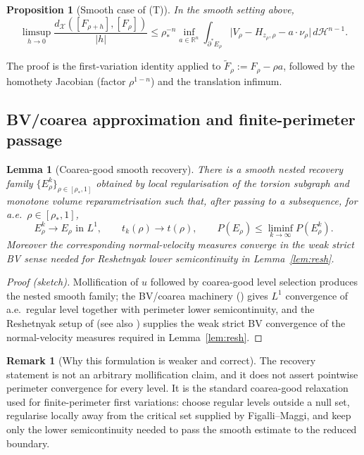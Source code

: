 \documentclass[11pt]{article}
\newtheorem{proposition}[theorem]{Proposition}
\newtheorem{lemma}[theorem]{Lemma}
\theoremstyle{definition}
\newtheorem{remark}[theorem]{Remark}
\newcommand{\R}{\mathbb{R}}
\newcommand{\rstar}{\rho_{*}}
\newcommand{\X}{\mathcal X}
\begin{document}
\begin{proposition}[Smooth case of (T)]\label{prop:T-smooth}
In the smooth setting above,
\begin{equation}\label{eq:T-smooth-X}
   \limsup_{h\to 0}\frac{d_\X([F_{\rho+h}],[F_\rho])}{|h|}
   \le \rstar^{-n}\inf_{a\in\R^n}\int_{\partial^*E_\rho}
       \bigl|V_\rho-H_{z_\rho,\rho}-a\cdot\nu_\rho\bigr|\,d\mathcal H^{n-1}.
\end{equation}
\end{proposition}

The proof is the first-variation identity \cite[\S17.3]{Maggi2012}
applied to $\widetilde F_\rho:=F_\rho-\rho a$, followed by the homothety
Jacobian (factor $\rho^{1-n}$) and the translation infimum.

\subsection{BV/coarea approximation and finite-perimeter passage}\label{ss:T-bv}

\begin{lemma}[Coarea-good smooth recovery]\label{lem:approx}
There is a smooth nested recovery family $\{E_\rho^k\}_{\rho\in[\rstar,1]}$
obtained by local regularisation of the torsion subgraph and monotone
volume reparametrisation such that, after passing to a subsequence, for
a.e.\ $\rho\in[\rstar,1]$,
\[
   E_\rho^k\to E_\rho\text{ in }L^1,\qquad
   t_k(\rho)\to t(\rho),\qquad
   P(E_\rho)\le\liminf_{k\to\infty}P(E_\rho^k).
\]
Moreover the corresponding normal-velocity measures converge in the weak
strict BV sense needed for Reshetnyak lower semicontinuity in
Lemma~\ref{lem:resh}.
\end{lemma}

\begin{proof}[Proof (sketch)]
Mollification of $u$ followed by coarea-good level selection produces the
nested smooth family; the BV/coarea machinery (\cite[\S 13]{Maggi2012}) gives
$L^1$ convergence of a.e.\ regular level together with perimeter lower
semicontinuity, and the Reshetnyak setup of \cite[\S 17]{Maggi2012}
(see also \cite[Thm.~2.39]{AFP2000}) supplies the weak strict BV convergence
of the normal-velocity measures required in Lemma~\ref{lem:resh}.
\end{proof}

\begin{remark}[Why this formulation is weaker and correct]
The recovery statement is not an arbitrary mollification claim, and it does
not assert pointwise perimeter convergence for every level.  It is the
standard coarea-good relaxation used for finite-perimeter first variations:
choose regular levels outside a null set, regularise locally away from the
critical set supplied by Figalli--Maggi, and keep only the lower
semicontinuity needed to pass the smooth estimate to the reduced boundary.
\end{remark}
\end{document}

